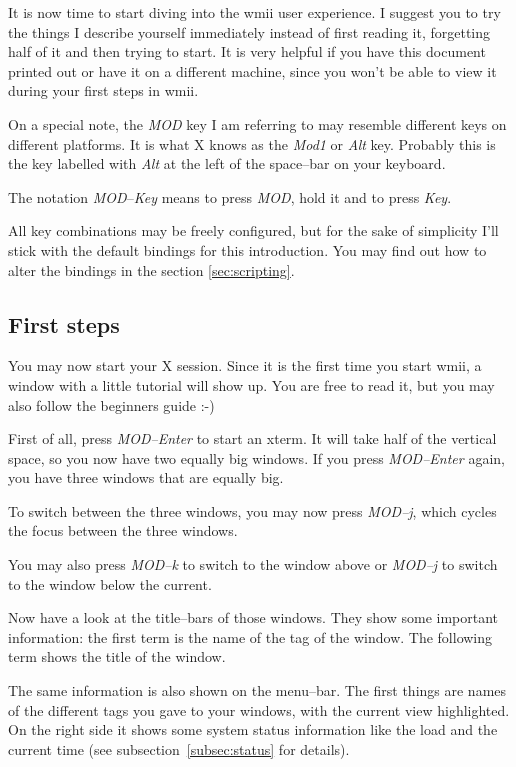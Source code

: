 \documentclass[12pt,a4paper]{article} %
\begin{document}
  It is now time to start diving into the wmii user experience. I
  suggest you to try the things I describe yourself immediately
  instead of first reading it, forgetting half of it and then trying
  to start. It is very helpful if you have this document printed out
  or have it on a different machine, since you won't be able to view
  it during your first steps in wmii.

  On a special note, the \emph{MOD} key I am referring to may resemble
  different keys on different platforms. It is what X knows as the
  \emph{Mod1} or \emph{Alt} key. Probably this is the key labelled with
  \emph{Alt} at the left of the space--bar on your keyboard.

  The notation \emph{MOD}--\emph{Key} means to press \emph{MOD}, hold
  it and to press \emph{Key}.

  All key combinations may be freely configured, but for the sake of
  simplicity I'll stick with the default bindings for this
  introduction.  You may find out how to alter the bindings in the
  section \ref{sec:scripting}.

  \subsection{First steps}
  \label{subsec:firststeps}

    You may now start your X session. Since it is the first time you
    start wmii, a window with a little tutorial will show up. You are
    free to read it, but you may also follow the beginners guide :-)

    First of all, press \emph{MOD--Enter} to start an xterm. It will
    take half of the vertical space, so you now have two equally big
    windows. If you press \emph{MOD--Enter} again, you have three
    windows that are equally big.

    To switch between the three windows, you may now press
    \emph{MOD--j}, which cycles the focus between the three windows.

    You may also press \emph{MOD--k} to switch to the window above or
    \emph{MOD--j} to switch to the window below the current.

    Now have a look at the title--bars of those windows. They show some
    important information: the first term is the name of the tag of
    the window. The following term shows the title of the window.

    The same information is also shown on the menu--bar. The first
    things are names of the different tags you gave to your windows,
    with the current view highlighted. On the right side it shows some
    system status information like the load and the current time 
    (see subsection~\ref{subsec:status} for details).
\end{document}
